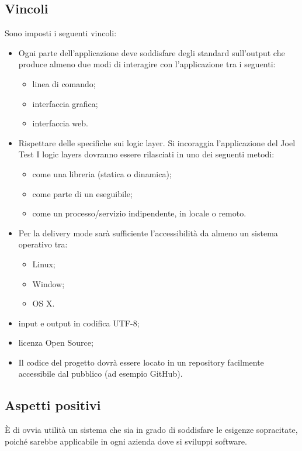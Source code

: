 \subsection{Vincoli}
Sono imposti i seguenti vincoli:
\begin{itemize}
\item Ogni parte dell'applicazione deve soddisfare degli standard sull'output che produce
almeno due modi di interagire con l'applicazione tra i seguenti:
\begin{itemize}
\item linea di comando;
\item interfaccia grafica;
\item interfaccia web.
\end{itemize}

\item Rispettare delle specifiche sui logic layer. Si incoraggia l'applicazione del Joel Test I logic layers dovranno essere rilasciati in uno dei seguenti metodi:
\begin{itemize}
\item come una libreria (statica o dinamica);
\item come parte di un eseguibile;
\item come un processo/servizio indipendente, in locale o remoto.
\end{itemize}

\item Per la delivery mode sar\`a sufficiente l'accessibilit\`a da almeno un sistema operativo tra:
\begin{itemize}
\item Linux;
\item Window;
\item OS X.
\end{itemize}

\item input e output in codifica UTF-8;
\item licenza Open Source;
\item Il codice del progetto dovr\`a essere locato in un repository facilmente accessibile dal pubblico (ad esempio GitHub).
\end{itemize}

\subsection{Aspetti positivi}
\`E di ovvia utilit\`a un sistema che sia in grado di soddisfare le esigenze sopracitate, poich\'e sarebbe applicabile in ogni azienda dove si sviluppi software.

